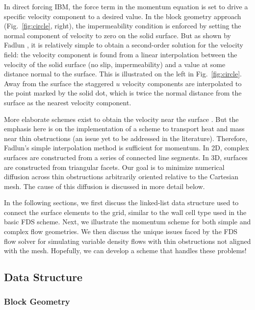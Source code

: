 \documentclass[12pt]{article}
\begin{document}
In direct forcing IBM, the force term in the momentum equation is set to drive a specific velocity component to a desired value.  In the block geometry approach (Fig.~\ref{fig:circle}, right), the impermeability condition is enforced by setting the normal component of velocity to zero on the solid surface. But as shown by Fadlun \cite{Fadlun:temp}, it is relatively simple to obtain a second-order solution for the velocity field: the velocity component is found from a linear interpolation between the velocity of the solid surface (no slip, impermeability) and a value at some distance normal to the surface.  This is illustrated on the left in Fig.~\ref{fig:circle}.  Away from the surface the staggered $u$ velocity components are interpolated to the point marked by the solid dot, which is twice the normal distance from the surface as the nearest velocity component.

More elaborate schemes exist to obtain the velocity near the surface \cite{Balaras:temp,Choi:temp,McDermott:temp}.  But the emphasis here is on the implementation of a scheme to transport heat and mass near thin obstructions (an issue yet to be addressed in the literature).  Therefore, Fadlun's simple interpolation method is sufficient for momentum.   In 2D, complex surfaces are constructed from a series of connected line segments. In 3D, surfaces are constructed from triangular facets.  Our goal is to minimize numerical diffusion across thin obstructions arbitrarily oriented relative to the Cartesian mesh.  The cause of this diffusion is discussed in more detail below.

In the following sections, we first discuss the linked-list data structure used to connect the surface elements to the grid, similar to the wall cell type used in the basic FDS scheme.  Next, we illustrate the momentum scheme for both simple and complex flow geometries.  We then discuss the unique issues faced by the FDS flow solver for simulating variable density flows with thin obstructions not aligned with the mesh.  Hopefully, we can develop a scheme that handles these problems!

\subsection{Data Structure}

\subsubsection{Block Geometry}
\end{document}
